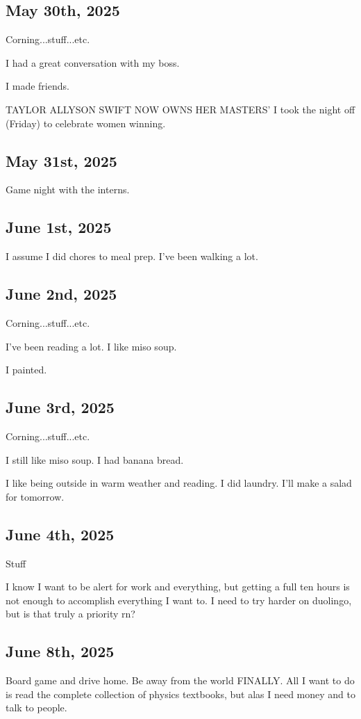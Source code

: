 \documentclass{article}
\begin{document}
\subsection{May 30th, 2025}
Corning...stuff...etc. 

I had a great conversation with my boss. 

I made friends. 

TAYLOR ALLYSON SWIFT NOW OWNS HER MASTERS' I took the night off (Friday) to celebrate women winning. 


\subsection{May 31st, 2025}
Game night with the interns. 


\subsection{June 1st, 2025}
I assume I did chores to meal prep. I've been walking a lot. 


\subsection{June 2nd, 2025}
Corning...stuff...etc. 

I've been reading a lot. I like miso soup. 

I painted. 

\subsection{June 3rd, 2025}
Corning...stuff...etc. 

I still like miso soup. I had banana bread.

I like being outside in warm weather and reading.
I did laundry. 
I'll make a salad for tomorrow. 

\subsection{June 4th, 2025}
Stuff

I know I want to be alert for work and everything, but getting a full ten hours is not enough to accomplish everything I want to. I need to try harder on duolingo, but is that truly a priority rn? 

\subsection{June 8th, 2025}
Board game and drive home. Be away from the world FINALLY. All I want to do is read the complete collection of physics textbooks, but alas I need money and to talk to people.
\end{document}
